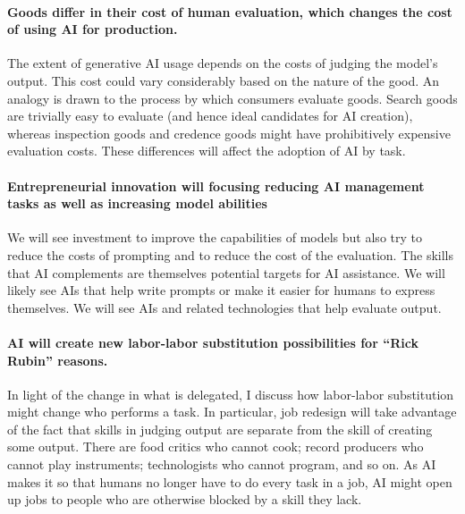 \documentclass{article}
\begin{document}
\paragraph{Goods differ in their cost of human evaluation, which changes the cost of using AI for production.}
The extent of generative AI usage depends on the costs of judging the model's output.
This cost could vary considerably based on the nature of the good.
An analogy is drawn to the process by which consumers evaluate goods. 
Search goods are trivially easy to evaluate (and hence ideal candidates for AI creation), whereas inspection goods and credence goods might have prohibitively expensive evaluation costs. 
These differences will affect the adoption of AI by task.

\paragraph{Entrepreneurial innovation will focusing reducing AI management tasks as well as increasing model abilities}
We will see investment to improve the capabilities of models but also try to reduce the costs of prompting and to reduce the cost of the evaluation. 
The skills that AI complements are themselves potential targets for AI assistance. 
We will likely see AIs that help write prompts or make it easier for humans to express themselves.  
We will see AIs and related technologies that help evaluate output. 

\paragraph{AI will create new labor-labor substitution possibilities for ``Rick Rubin'' reasons.}
In light of the change in what is delegated, I discuss how labor-labor substitution might change who performs a task. 
In particular, job redesign will take advantage of the fact that skills in judging output are separate from the skill of creating some output.
There are food critics who cannot cook; record producers who cannot play instruments; technologists who cannot program, and so on.
As AI makes it so that humans no longer have to do every task in a job, AI might open up jobs to people who are otherwise blocked by a skill they lack.
\end{document}

